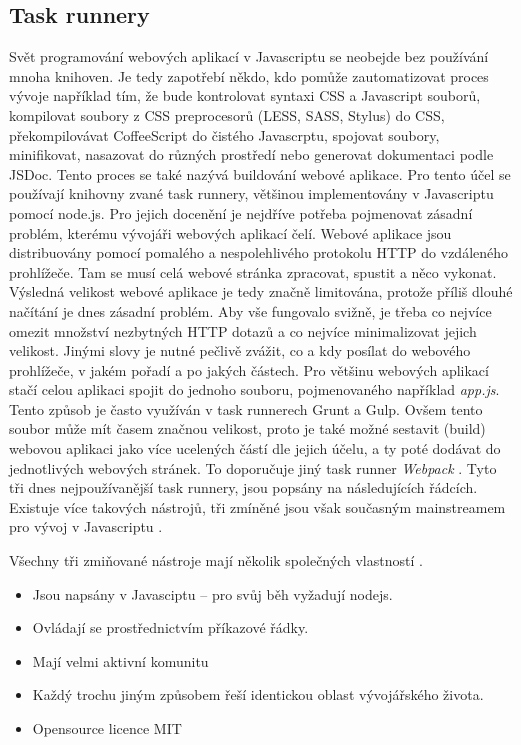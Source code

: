 \subsection{Task runnery}
\label{sec:task_runners}
Svět programování webových aplikací v Javascriptu se neobejde bez používání mnoha knihoven. Je tedy zapotřebí někdo, kdo pomůže zautomatizovat proces vývoje například tím, že bude kontrolovat syntaxi CSS a Javascript souborů, kompilovat soubory z CSS preprocesorů (LESS, SASS, Stylus) do CSS, překompilovávat CoffeeScript do čistého Javascrptu, spojovat soubory, minifikovat, nasazovat do různých prostředí nebo generovat dokumentaci podle JSDoc. Tento proces se také nazývá buildování webové aplikace. Pro tento účel se používají knihovny zvané task runnery, většinou implementovány v Javascriptu pomocí node.js. Pro jejich docenění je nejdříve potřeba pojmenovat zásadní problém, kterému vývojáři webových aplikací čelí. Webové aplikace jsou distribuovány pomocí pomalého a nespolehlivého protokolu HTTP do vzdáleného prohlížeče. Tam se musí celá webové stránka zpracovat, spustit a něco vykonat. Výsledná velikost webové aplikace je tedy značně limitována, protože příliš dlouhé načítání je dnes zásadní problém. Aby vše fungovalo svižně, je třeba co nejvíce omezit množství nezbytných HTTP dotazů a co nejvíce minimalizovat jejich velikost. Jinými slovy je nutné pečlivě zvážit, co a kdy posílat do webového prohlížeče, v jakém pořadí a po jakých částech. Pro většinu webových aplikací stačí celou aplikaci spojit do jednoho souboru, pojmenovaného například \textit{app.js}. Tento způsob je často využíván v task runnerech Grunt a Gulp. Ovšem tento soubor může mít časem značnou velikost, proto je také možné sestavit (build) webovou aplikaci jako více ucelených částí dle jejich účelu, a ty poté dodávat do jednotlivých webových stránek. To doporučuje jiný task runner \textit{Webpack} \cite{webpack}. Tyto tři dnes nejpoužívanější task runnery, jsou popsány na následujících řádcích. Existuje více takových nástrojů, tři zmíněné jsou však současným mainstreamem pro vývoj v Javascriptu \cite{task_runners} \cite{zdrojak_gulp}.

\vspace{0,3cm}
\noindent Všechny tři zmiňované nástroje mají několik společných vlastností \cite{zdrojak_gulp}.
\begin{itemize}
\item Jsou napsány v Javasciptu – pro svůj běh vyžadují nodejs.
\item Ovládají se prostřednictvím příkazové řádky.
\item Mají velmi aktivní komunitu 
\item Každý trochu jiným způsobem řeší identickou oblast vývojářského života.
\item Opensource licence MIT
\end{itemize}


